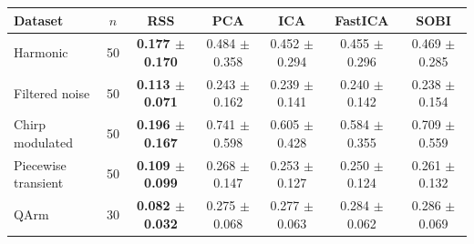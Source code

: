 \begin{tabular}{lcccccc}
\hline
Dataset & $n$ & RSS & PCA & ICA & FastICA & SOBI \\
\hline
Harmonic & 50 & \textbf{0.177 $\pm$ 0.170} & 0.484 $\pm$ 0.358 & 0.452 $\pm$ 0.294 & 0.455 $\pm$ 0.296 & 0.469 $\pm$ 0.285 \\
Filtered noise & 50 & \textbf{0.113 $\pm$ 0.071} & 0.243 $\pm$ 0.162 & 0.239 $\pm$ 0.141 & 0.240 $\pm$ 0.142 & 0.238 $\pm$ 0.154 \\
Chirp modulated & 50 & \textbf{0.196 $\pm$ 0.167} & 0.741 $\pm$ 0.598 & 0.605 $\pm$ 0.428 & 0.584 $\pm$ 0.355 & 0.709 $\pm$ 0.559 \\
Piecewise transient & 50 & \textbf{0.109 $\pm$ 0.099} & 0.268 $\pm$ 0.147 & 0.253 $\pm$ 0.127 & 0.250 $\pm$ 0.124 & 0.261 $\pm$ 0.132 \\
QArm & 30 & \textbf{0.082 $\pm$ 0.032} & 0.275 $\pm$ 0.068 & 0.277 $\pm$ 0.063 & 0.284 $\pm$ 0.062 & 0.286 $\pm$ 0.069 \\
\hline
\end{tabular}